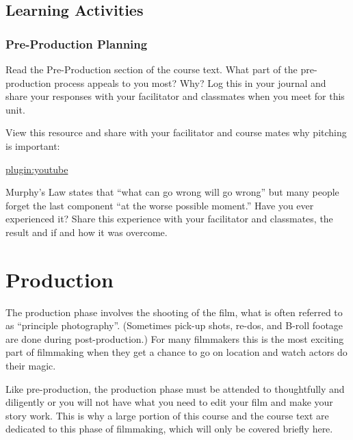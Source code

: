 \documentclass[
]{book}
\begin{document}
\hypertarget{learning-activities-6}{%
\subsection*{Learning Activities}\label{learning-activities-6}}

\begin{reflect}
\hypertarget{pre-production-planning}{%
\subsubsection*{Pre-Production Planning}\label{pre-production-planning}}

Read the Pre-Production section of the course text. What part of the pre-production process appeals to you most? Why? Log this in your journal and share your responses with your facilitator and classmates when you meet for this unit.

View this resource and share with your facilitator and course mates why pitching is important:

\href{https://www.youtube.com/watch?v=JE53JL60ihc}{plugin:youtube}

Murphy's Law states that ``what can go wrong will go wrong'' but many people forget the last component ``at the worse possible moment.'' Have you ever experienced it? Share this experience with your facilitator and classmates, the result and if and how it was overcome.
\end{reflect}

\hypertarget{production}{%
\section{Production}\label{production}}

The production phase involves the shooting of the film, what is often referred to as ``principle photography''. (Sometimes pick-up shots, re-dos, and B-roll footage are done during post-production.) For many filmmakers this is the most exciting part of filmmaking when they get a chance to go on location and watch actors do their magic.

Like pre-production, the production phase must be attended to thoughtfully and diligently or you will not have what you need to edit your film and make your story work. This is why a large portion of this course and the course text are dedicated to this phase of filmmaking, which will only be covered briefly here.
\end{document}
